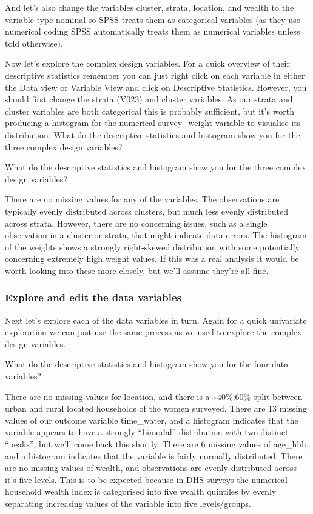 \documentclass[
]{book}
\begin{document}
And let's also change the variables cluster, strata, location, and wealth to the variable type nominal so SPSS treats them as categorical variables (as they use numerical coding SPSS automatically treats them as numerical variables unless told otherwise).

Now let's explore the complex design variables. For a quick overview of their descriptive statistics remember you can just right click on each variable in either the Data view or Variable View and click on Descriptive Statistics. However, you should first change the strata (V023) and cluster variables. As our strata and cluster variables are both categorical this is probably sufficient, but it's worth producing a histogram for the numerical survey\_weight variable to visualise its distribution. What do the descriptive statistics and histogram show you for the three complex design variables?

What do the descriptive statistics and histogram show you for the three complex design variables?

There are no missing values for any of the variables. The observations are typically evenly distributed across clusters, but much less evenly distributed across strata. However, there are no concerning issues, such as a single observation in a cluster or strata, that might indicate data errors. The histogram of the weights shows a strongly right-skewed distribution with some potentially concerning extremely high weight values. If this was a real analysis it would be worth looking into these more closely, but we'll assume they're all fine.

\hypertarget{explore-and-edit-the-data-variables}{%
\subsubsection{Explore and edit the data variables}\label{explore-and-edit-the-data-variables}}

Next let's explore each of the data variables in turn. Again for a quick univariate exploration we can just use the same process as we used to explore the complex design variables.

What do the descriptive statistics and histogram show you for the four data variables?

There are no missing values for location, and there is a \textasciitilde40\%:60\% split between urban and rural located households of the women surveyed. There are 13 missing values of our outcome variable time\_water, and a histogram indicates that the variable appears to have a strongly ``bimodal'' distribution with two distinct ``peaks'', but we'll come back this shortly. There are 6 missing values of age\_hhh, and a histogram indicates that the variable is fairly normally distributed. There are no missing values of wealth, and observations are evenly distributed across it's five levels. This is to be expected because in DHS surveys the numerical household wealth index is categorised into five wealth quintiles by evenly separating increasing values of the variable into five levels/groups.
\end{document}
